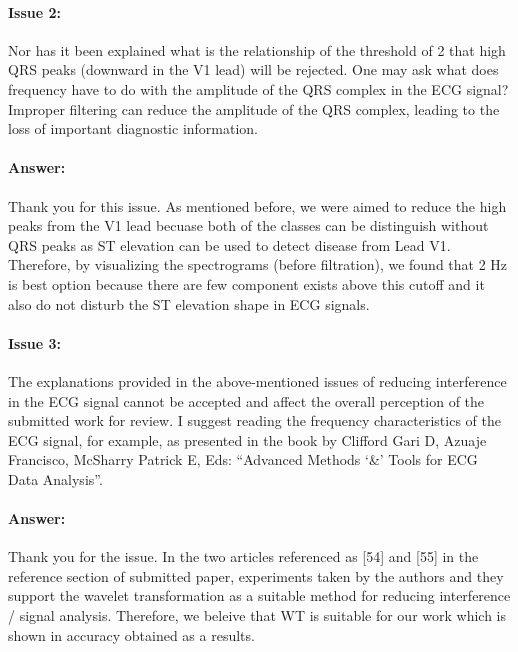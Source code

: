\documentclass{article}
\begin{document}
\paragraph{Issue 2:}
\begin{displayquote}
Nor has it been explained what is the relationship of the threshold of 2 that high QRS peaks (downward in the V1 lead) will be rejected. One may ask what does frequency have to do with the amplitude of the QRS complex in the ECG signal? Improper filtering can reduce the amplitude of the QRS complex, leading to the loss of important diagnostic information.
\end{displayquote}

\paragraph{Answer:}
Thank you for this issue. As mentioned before, we were aimed to reduce the high peaks from the V1 lead becuase both of the classes can be distinguish without QRS peaks as ST elevation can be used to detect disease from Lead V1. Therefore, by visualizing the spectrograms (before filtration), we found that 2 Hz is best option because there are few component exists above this cutoff and it also do not disturb the ST elevation shape in ECG signals.

\paragraph{Issue 3:}
\begin{displayquote}
The explanations provided in the above-mentioned issues of reducing interference in the ECG signal cannot be accepted and affect the overall perception of the submitted work for review. I suggest reading the frequency characteristics of the ECG signal, for example, as presented in the book by Clifford Gari D, Azuaje Francisco, McSharry Patrick E, Eds: ``Advanced Methods `\&' Tools for ECG Data Analysis''.
\end{displayquote}

\paragraph{Answer:}
Thank you for the issue. In the two articles referenced as [54] and [55] in the reference section of submitted paper, experiments taken by the authors and they support the wavelet transformation as a suitable method for reducing interference / signal analysis. Therefore, we beleive that WT is suitable for our work which is shown in accuracy obtained as a results.
\end{document}
